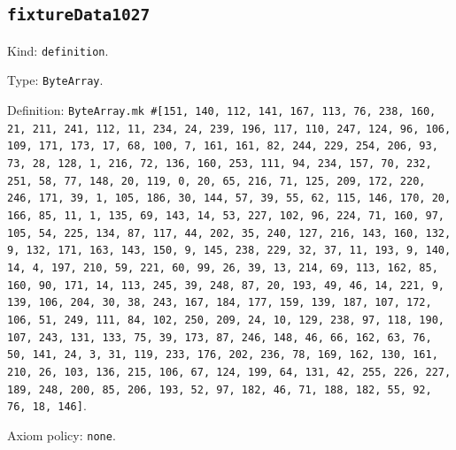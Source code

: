 \documentclass[11pt]{article}
\begin{document}
\subsection*{\texttt{fixtureData1027}}
\noindent Kind: \texttt{definition}.\par
\noindent Type: \texttt{ByteArray}.\par
\noindent Definition: \texttt{ByteArray.mk \#[151, 140, 112, 141, 167, 113, 76, 238, 160, 21, 211, 241, 112, 11, 234, 24, 239, 196, 117, 110, 247, 124, 96, 106, 109, 171, 173, 17, 68, 100, 7, 161, 161, 82, 244, 229, 254, 206, 93, 73, 28, 128, 1, 216, 72, 136, 160, 253, 111, 94, 234, 157, 70, 232, 251, 58, 77, 148, 20, 119, 0, 20, 65, 216, 71, 125, 209, 172, 220, 246, 171, 39, 1, 105, 186, 30, 144, 57, 39, 55, 62, 115, 146, 170, 20, 166, 85, 11, 1, 135, 69, 143, 14, 53, 227, 102, 96, 224, 71, 160, 97, 105, 54, 225, 134, 87, 117, 44, 202, 35, 240, 127, 216, 143, 160, 132, 9, 132, 171, 163, 143, 150, 9, 145, 238, 229, 32, 37, 11, 193, 9, 140, 14, 4, 197, 210, 59, 221, 60, 99, 26, 39, 13, 214, 69, 113, 162, 85, 160, 90, 171, 14, 113, 245, 39, 248, 87, 20, 193, 49, 46, 14, 221, 9, 139, 106, 204, 30, 38, 243, 167, 184, 177, 159, 139, 187, 107, 172, 106, 51, 249, 111, 84, 102, 250, 209, 24, 10, 129, 238, 97, 118, 190, 107, 243, 131, 133, 75, 39, 173, 87, 246, 148, 46, 66, 162, 63, 76, 50, 141, 24, 3, 31, 119, 233, 176, 202, 236, 78, 169, 162, 130, 161, 210, 26, 103, 136, 215, 106, 67, 124, 199, 64, 131, 42, 255, 226, 227, 189, 248, 200, 85, 206, 193, 52, 97, 182, 46, 71, 188, 182, 55, 92, 76, 18, 146]}.\par
\noindent Axiom policy: \texttt{none}.\par
\end{document}
